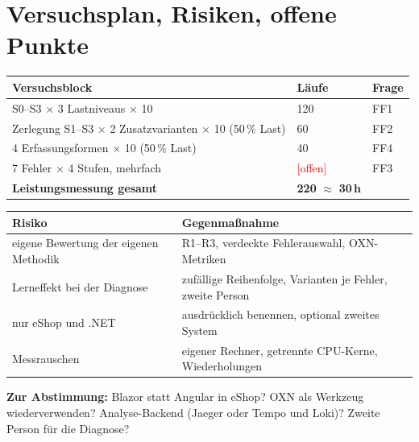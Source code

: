 \documentclass[11pt, a4paper]{article}
\newcommand{\offen}[1]{\textcolor{red}{[#1]}}
\begin{document}
\section{Versuchsplan, Risiken, offene Punkte}

\begin{center}
\small
\begin{tabularx}{\textwidth}{@{}X l l@{}}
\toprule
\textbf{Versuchsblock} & \textbf{Läufe} & \textbf{Frage} \\
\midrule
S0--S3 $\times$ 3 Lastniveaus $\times$ 10 & 120 & FF1 \\
Zerlegung S1--S3 $\times$ 2 Zusatzvarianten $\times$ 10 (50\,\% Last) & 60 & FF2 \\
4 Erfassungsformen $\times$ 10 (50\,\% Last) & 40 & FF4 \\
7 Fehler $\times$ 4 Stufen, mehrfach & \offen{offen} & FF3 \\
\midrule
\textbf{Leistungsmessung gesamt} & \textbf{220} $\approx$ \textbf{30\,h} & \\
\bottomrule
\end{tabularx}
\end{center}

\begin{center}
\small
\begin{tabularx}{\textwidth}{@{}l X@{}}
\toprule
\textbf{Risiko \cite{wohlin2012experimentation}} & \textbf{Gegenmaßnahme} \\
\midrule
eigene Bewertung der eigenen Methodik & R1--R3, verdeckte Fehlerauswahl, OXN-Metriken \\
Lerneffekt bei der Diagnose & zufällige Reihenfolge, Varianten je Fehler, zweite Person \\
nur eShop und .NET & ausdrücklich benennen, optional zweites System \\
Messrauschen & eigener Rechner, getrennte CPU-Kerne, Wiederholungen \\
\bottomrule
\end{tabularx}
\end{center}

\textbf{Zur Abstimmung:} Blazor statt Angular in eShop? OXN als Werkzeug wiederverwenden? Analyse-Backend (Jaeger oder Tempo und Loki)? Zweite Person für die Diagnose?

\printbibliography[heading=bibintoc, title={Literaturverzeichnis}]
\end{document}
